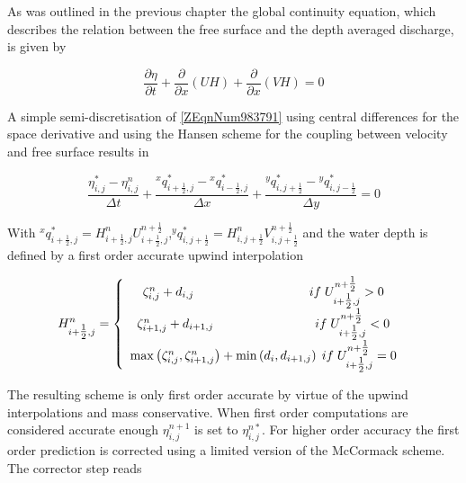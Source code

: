 \documentclass{article}
\begin{document}
\noindent As was outlined in the previous chapter the global continuity equation, which describes the relation between the free surface and the depth averaged discharge, is given by

\noindent 
\begin{equation} \label{ZEqnNum983791} 
\frac{\partial \eta }{\partial t} +\frac{\partial }{\partial x} \left(UH\right)+\frac{\partial }{\partial x} \left(VH\right)=0 
\end{equation} 


\noindent A simple semi-discretisation of \eqref{ZEqnNum983791} using central differences for the space derivative and using the Hansen scheme for the coupling between velocity and free surface results in

\noindent 
\begin{equation} \label{ZEqnNum570839} 
\frac{\eta _{i,j}^{*} -\eta _{i,j}^{n} }{\Delta t} +\frac{{}^{x} q_{i+{\tfrac{1}{2}} ,j}^{*} -{}^{x} q_{i-{\tfrac{1}{2}} ,j}^{*} }{\Delta x} +\frac{{}^{y} q_{i,j+{\tfrac{1}{2}} }^{*} -{}^{y} q_{i,j-{\tfrac{1}{2}} }^{*} }{\Delta y} =0 
\end{equation} 


\noindent With ${}^{x} q_{i+{\tfrac{1}{2}} ,j}^{*} =H_{i+{\tfrac{1}{2}} ,j}^{n} U_{i+{\tfrac{1}{2}} ,j}^{n+{\tfrac{1}{2}} } $,${}^{y} q_{i,j+{\tfrac{1}{2}} }^{*} =H_{i,j+{\tfrac{1}{2}} }^{n} V_{i,j+{\tfrac{1}{2}} }^{n+{\tfrac{1}{2}} } $ and the water depth is defined by a first order accurate upwind interpolation 

\noindent 
\begin{equation} \label{ZEqnNum559032} 
H_{i+{\tfrac{1}{2}} ,j}^{n} =\left\{\begin{array}{c} {\zeta _{i,j}^{n} +d_{i,j} {\rm \; \; \; \; \; \; \; \; \; \; \; \; \; \; \; \; \; \; \; \; \; \; \; \; \; \; \; \; \; \; \; \; \; }if{\rm \; }U_{i+{\tfrac{1}{2}} ,j}^{n+{\tfrac{1}{2}} } >0} \\ {\zeta _{i+1,j}^{n} +d_{i+1,j} {\rm \; \; \; \; \; \; \; \; \; \; \; \; \; \; \; \; \; \; \; \; \; \; \; \; \; \; \; \; \; }if{\rm \; }U_{i+{\tfrac{1}{2}} ,j}^{n+{\tfrac{1}{2}} } <0} \\ {\max \left(\zeta _{i,j}^{n} ,\zeta _{i+1,j}^{n} \right)+\min \left(d_{i} ,d_{i+1,j} \right){\rm \; }if{\rm \; }U_{i+{\tfrac{1}{2}} ,j}^{n+{\tfrac{1}{2}} } =0} \end{array}\right. {\rm \; } 
\end{equation} 


\noindent The resulting scheme is only first order accurate by virtue of the upwind interpolations and mass conservative. When first order computations are considered accurate enough $\eta _{i,j}^{n+1} $ is set to $\eta _{i,j}^{n*} $. For higher order accuracy the first order prediction is corrected using a limited version of the McCormack scheme. The corrector step reads
\end{document}
